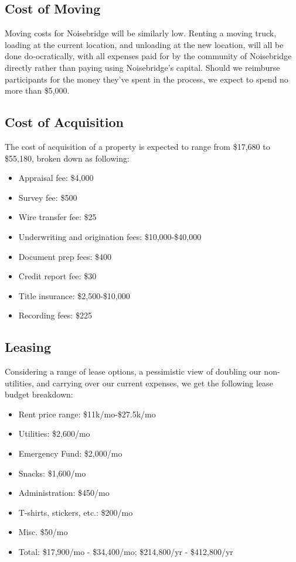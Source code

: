 \documentclass[12pt]{article}
\begin{document}
\subsection{Cost of Moving}

Moving costs for Noisebridge will be similarly low. Renting a moving truck, loading at the current location, and unloading at the new location, will all be done do-ocratically, with all expenses paid for by the community of Noisebridge directly rather than paying using Noisebridge's capital. Should we reimburse participants for the money they've spent in the process, we expect to spend no more than \$5,000.



\subsection{Cost of Acquisition}

The cost of acquisition of a property is expected to range from \$17,680 to \$55,180, broken down as following:

\begin{itemize}
  \item Appraisal fee: \$4,000
  \item Survey fee: \$500
  \item Wire transfer fee: \$25
  \item Underwriting and origination fees:  \$10,000-\$40,000
  \item Document prep fees: \$400
  \item Credit report fee: \$30
  \item Title insurance: \$2,500-\$10,000
  \item Recording fees: \$225
\end{itemize}



\subsection{Leasing}


Considering a range of lease options, a pessimistic view of doubling our non-utilities, and carrying over our current expenses, we get the following lease budget breakdown:

\begin{itemize}
    \item Rent price range: \$11k/mo-\$27.5k/mo
    \item Utilities: \$2,600/mo
    \item Emergency Fund: \$2,000/mo
    \item Snacks: \$1,600/mo
    \item Administration: \$450/mo
    \item T-shirts, stickers, etc.: \$200/mo
    \item Misc. \$50/mo
    \item Total: \$17,900/mo - \$34,400/mo; \$214,800/yr - \$412,800/yr
\end{itemize}
\end{document}
